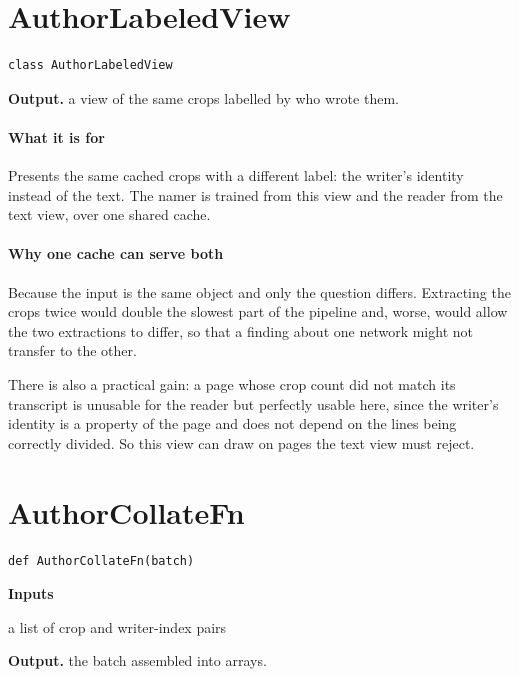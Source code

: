 \section{AuthorLabeledView}
\begin{lstlisting}[style=sig]
class AuthorLabeledView
\end{lstlisting}

\noindent\textbf{Output.} a view of the same crops labelled by who wrote them.


\paragraph{What it is for}
Presents the same cached crops with a different label: the writer's identity instead of the text. The namer is trained from this view and the reader from the text view, over one shared cache.


\paragraph{Why one cache can serve both}
Because the input is the same object and only the question differs. Extracting the crops twice would double the slowest part of the pipeline and, worse, would allow the two extractions to differ, so that a finding about one network might not transfer to the other.

There is also a practical gain: a page whose crop count did not match its transcript is unusable for the reader but perfectly usable here, since the writer's identity is a property of the page and does not depend on the lines being correctly divided. So this view can draw on pages the text view must reject.


\section{AuthorCollateFn}
\begin{lstlisting}[style=sig]
def AuthorCollateFn(batch)
\end{lstlisting}

\noindent\textbf{Inputs}
\begin{description}[leftmargin=2.2em,style=nextline,font=\normalfont\ttfamily]\setlength\itemsep{1pt}
  \item[{batch}] \normalfont a list of crop and writer-index pairs
\end{description}

\noindent\textbf{Output.} the batch assembled into arrays.


